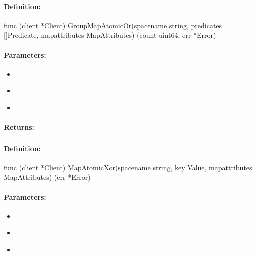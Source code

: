 \paragraph{Definition:}
\begin{gocode}
func (client *Client) GroupMapAtomicOr(spacename string, predicates []Predicate, mapattributes MapAttributes) (count uint64, err *Error)
\end{gocode}

\paragraph{Parameters:}
\begin{itemize}[noitemsep]
\item {}\\

\item {}\\

\item {}\\

\end{itemize}

\paragraph{Returns:}


\pagebreak
\subsubsection{}
\label{api:Go:MapAtomicXor}


\paragraph{Definition:}
\begin{gocode}
func (client *Client) MapAtomicXor(spacename string, key Value, mapattributes MapAttributes) (err *Error)
\end{gocode}

\paragraph{Parameters:}
\begin{itemize}[noitemsep]
\item {}\\

\item {}\\

\item {}\\

\end{itemize}

